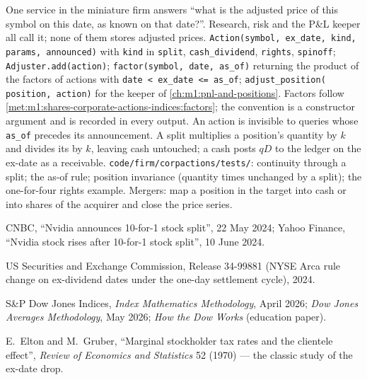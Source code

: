 \begin{build}
 One service in the miniature firm answers ``what is the
adjusted price of this symbol on this date, as known on that date?''.
Research, risk and the P\&L keeper all call it; none of them stores adjusted
prices.
 \texttt{Action(symbol, ex\_date, kind, params,
announced)} with \texttt{kind} in \texttt{split}, \texttt{cash\_dividend},
\texttt{rights}, \texttt{spinoff}; \texttt{Adjuster.add(action)};
\texttt{factor(symbol, date, as\_of)} returning the product of the factors of
actions with \texttt{date < ex\_date <= as\_of}; \texttt{adjust\_position(
position, action)} for the keeper of \cref{ch:m1:pnl-and-positions}.
 Factors follow
\cref{met:m1:shares-corporate-actions-indices:factors}; the 
convention is a constructor argument and is recorded in every output. An
action is invisible to queries whose \texttt{as\_of} precedes its
announcement. A split multiplies a position's quantity by $k$ and divides
its  by $k$, leaving cash untouched; a cash  posts $qD$
to the ledger on the ex-date as a receivable.
 \texttt{code/firm/corpactions/tests/}: continuity
through a split; the as-of rule; position invariance (quantity times  unchanged by a split); the one-for-four rights example.
 Mergers: map a position in the target into cash or into
shares of the acquirer and close the price series.
\end{build}

\begin{omsources}
\item CNBC, ``Nvidia announces 10-for-1 stock split'', 22 May 2024; Yahoo
Finance, ``Nvidia stock rises after 10-for-1 stock split'', 10 June 2024.
\item US Securities and Exchange Commission, Release 34-99881 (NYSE Arca
rule change on ex-dividend dates under the one-day settlement cycle), 2024.
\item S\&P Dow Jones Indices, \emph{Index Mathematics Methodology}, April
2026; \emph{Dow Jones Averages Methodology}, May 2026; \emph{How the Dow
Works} (education paper).
\item E.~Elton and M.~Gruber, ``Marginal stockholder tax rates and the
clientele effect'', \emph{Review of Economics and Statistics} 52 (1970) ---
the classic study of the ex-date drop.
\end{omsources}

